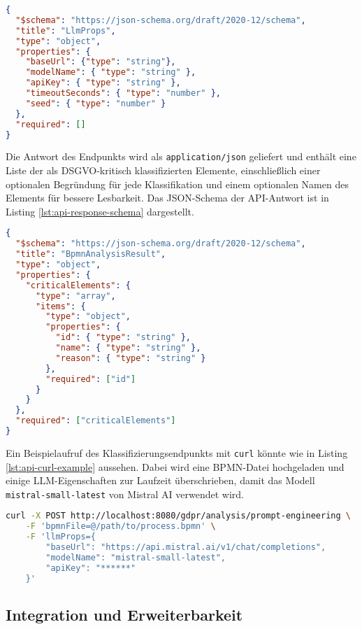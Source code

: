 \begin{lstlisting}[language=json,caption={JSON-Schema der \texttt{llmProps}.},label={lst:api-request-schema}]
{
  "$schema": "https://json-schema.org/draft/2020-12/schema",
  "title": "LlmProps",
  "type": "object",
  "properties": {
    "baseUrl": {"type": "string"},
    "modelName": { "type": "string" },
    "apiKey": { "type": "string" },
    "timeoutSeconds": { "type": "number" },
    "seed": { "type": "number" }
  },
  "required": []
}
\end{lstlisting}

Die Antwort des Endpunkts wird als \texttt{application/json} geliefert und enthält eine Liste der als \ac{DSGVO}-kritisch klassifizierten Elemente, einschließlich einer optionalen Begründung für jede Klassifikation und einem optionalen Namen des Elements für bessere Lesbarkeit. Das JSON-Schema der API-Antwort ist in Listing \ref{lst:api-response-schema} dargestellt.

\begin{lstlisting}[language=json,caption={JSON-Schema der API-Antwort.},label={lst:api-response-schema}]
{
  "$schema": "https://json-schema.org/draft/2020-12/schema",
  "title": "BpmnAnalysisResult",
  "type": "object",
  "properties": {
    "criticalElements": {
      "type": "array",
      "items": {
        "type": "object",
        "properties": {
          "id": { "type": "string" },
          "name": { "type": "string" },
          "reason": { "type": "string" }
        },
        "required": ["id"]
      }
    }
  },
  "required": ["criticalElements"]
}
\end{lstlisting}

Ein Beispielaufruf des Klassifizierungsendpunkts mit \texttt{curl} könnte wie in Listing \ref{lst:api-curl-example} aussehen. Dabei wird eine BPMN-Datei hochgeladen und einige \ac{LLM}-Eigenschaften zur Laufzeit überschrieben, damit das Modell \texttt{mistral-small-latest} von Mistral AI verwendet wird.

\begin{lstlisting}[language=bash,caption={Beispielaufruf des Klassifizierungsendpunkts mit \texttt{curl}.},label={lst:api-curl-example}]
curl -X POST http://localhost:8080/gdpr/analysis/prompt-engineering \
    -F 'bpmnFile=@/path/to/process.bpmn' \
    -F 'llmProps={
        "baseUrl": "https://api.mistral.ai/v1/chat/completions",
        "modelName": "mistral-small-latest",
        "apiKey": "******"
    }'
\end{lstlisting}

\subsection*{Integration und Erweiterbarkeit}

